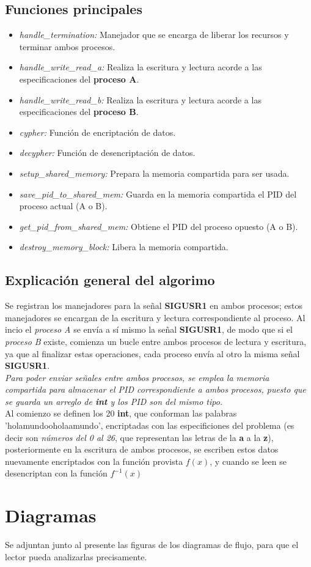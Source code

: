 \documentclass[letterpaper, 10 pt, conference]{ieeeconf}  %
\begin{document}
\subsection{Funciones principales}
\begin{itemize}
  \item \textit{handle\_termination:} Manejador que se encarga de liberar los recursos y terminar ambos procesos.
  \item \textit{handle\_write\_read\_a:} Realiza la escritura y lectura acorde a las especificaciones del \textbf{proceso A}.
  \item \textit{handle\_write\_read\_b:} Realiza la escritura y lectura acorde a las especificaciones del \textbf{proceso B}.
  \item \textit{cypher:} Función de encriptación de datos.
  \item \textit{decypher:} Función de desencriptación de datos.
  \item \textit{setup\_shared\_memory:} Prepara la memoria compartida para ser usada.
  \item \textit{save\_pid\_to\_shared\_mem:} Guarda en la memoria compartida el PID del proceso actual (A o B).
  \item \textit{get\_pid\_from\_shared\_mem:} Obtiene el PID del proceso opuesto (A o B).
  \item \textit{destroy\_memory\_block:} Libera la memoria compartida.
\end{itemize}

\subsection{Explicación general del algorimo}
Se registran los manejadores para la señal \textbf{SIGUSR1} en ambos procesos; estos manejadores se encargan de la escritura y lectura correspondiente al proceso. Al incio el \textit{proceso A} se envía a sí mismo la señal \textbf{SIGUSR1}, de modo que si el \textit{proceso B} existe, comienza un bucle entre ambos procesos de lectura y escritura, ya que al finalizar estas operaciones, cada proceso envía al otro la misma señal \textbf{SIGUSR1}. \\
\textit{Para poder enviar señales entre ambos procesos, se emplea la memoria compartida para almacenar el PID correspondiente a ambos procesos, puesto que se guarda un arreglo de \textbf{int} y los PID son del mismo tipo.} \\
Al comienzo se definen los 20 \textbf{int}, que conforman las palabras 'holamundooholaamundo', encriptadas con las especificiones del problema (es decir son \textit{números del 0 al 26}, que representan las letras de la \textbf{a} a la \textbf{z}), posteriormente en la escritura de ambos procesos, se escriben estos datos nuevamente encriptados con la función provista $f(x)$, y cuando se leen se desencriptan con la función $f^{-1}(x)$


\section{Diagramas}
Se adjuntan junto al presente las figuras de los diagramas de flujo, para que el lector pueda analizarlas precisamente.
\end{document}
